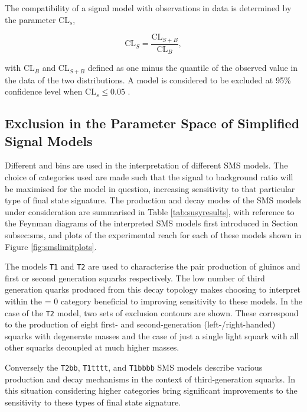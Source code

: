 The compatibility of a signal model with observations in data is determined by the parameter CL$_{s}$,

\begin{equation}
\text{CL$_{S}$} = \frac{\text{CL$_{S+B}$}}{\text{CL$_{B}$}},
\end{equation}

with CL$_{B}$ and CL$_{S+B}$ defined as one minus the quantile of the observed value in the data of the two distributions. A model is considered to be excluded at 95\% confidence level when CL$_{s} \leq 0.05$ \cite{2011EPJClimits}.

\subsection{Exclusion in the Parameter Space of Simplified Signal Models}

Different \njet and \nbreco bins are used in the interpretation of different \ac{SMS} models. The choice of categories used are made such that the signal to background ratio will be maximised for the model in question, increasing sensitivity to that particular type of final state signature. The production and decay modes of the \ac{SMS} models under consideration are summarised in Table \ref{tab:susyresults}, with reference to the Feynman diagrams of the interpreted \ac{SMS} models first introduced in Section {subsec:sms}, and plots of the experimental reach for each of these models shown in Figure \ref{fig:smslimitplots}.

The models \texttt{T1} and \texttt{T2} are used to characterise the pair production of gluinos and first or second generation squarks respectively. The low number of third generation quarks produced from this decay topology makes choosing to interpret within the \nbreco = 0 category beneficial to improving sensitivity to these models. In the case of the \texttt{T2} model, two sets of exclusion contours are shown. These correspond to the production of eight first- and second-generation (left-/right-handed) squarks with degenerate masses and the case of just a single light squark with all other squarks decoupled at much higher masses.

Conversely the \texttt{T2bb}, \texttt{T1tttt}, and \texttt{T1bbbb} \ac{SMS} models describe various production and decay mechanisms in the context of third-generation squarks. In this situation considering higher \nbreco categories bring significant improvements to the sensitivity to these types of final state signature. 

